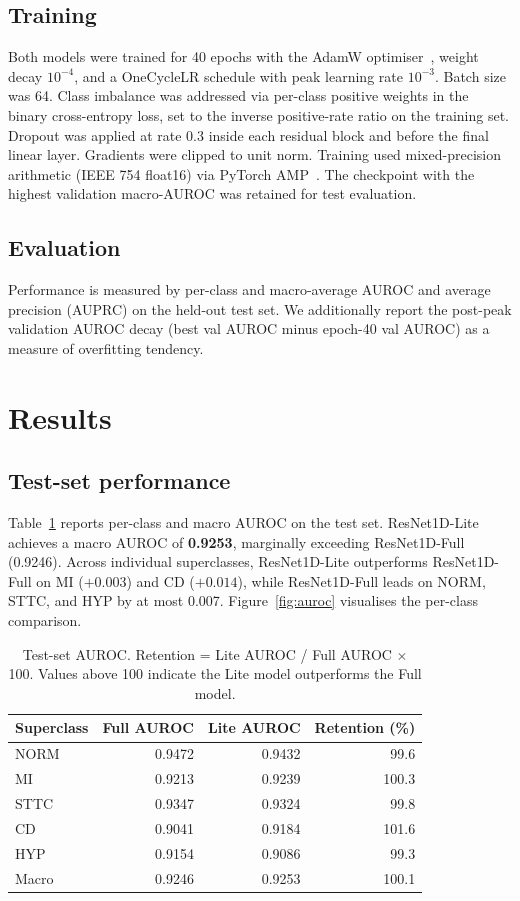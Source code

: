 \documentclass[11pt]{article}
\begin{document}
\subsection{Training}
Both models were trained for 40 epochs with the AdamW
optimiser~\cite{loshchilov2019}, weight decay $10^{-4}$, and a
OneCycleLR schedule with peak learning rate $10^{-3}$. Batch size was 64.
Class imbalance was addressed via per-class positive weights in the
binary cross-entropy loss, set to the inverse positive-rate ratio on the
training set. Dropout was applied at rate 0.3 inside each residual block
and before the final linear layer. Gradients were clipped to unit norm.
Training used mixed-precision arithmetic (IEEE 754 float16) via PyTorch
AMP~\cite{pytorch}. The checkpoint with the highest validation
macro-AUROC was retained for test evaluation.

\subsection{Evaluation}
Performance is measured by per-class and macro-average AUROC
and average precision (AUPRC) on the held-out test set.
We additionally report the post-peak validation AUROC decay
(best val AUROC minus epoch-40 val AUROC) as a measure of
overfitting tendency.

\section{Results}
\subsection{Test-set performance}
Table~\ref{tab:results} reports per-class and macro AUROC on the test
set. ResNet1D-Lite achieves a macro AUROC of \textbf{0.9253}, marginally
exceeding ResNet1D-Full (0.9246). Across individual superclasses,
ResNet1D-Lite outperforms ResNet1D-Full on MI ($+0.003$) and CD ($+0.014$),
while ResNet1D-Full leads on NORM, STTC, and HYP by at most 0.007.
Figure~\ref{fig:auroc} visualises the per-class comparison.

\begin{table}[h]
\centering
\caption{Test-set AUROC. Retention = Lite AUROC / Full AUROC $\times$ 100.
Values above 100 indicate the Lite model outperforms the Full model.}
\label{tab:results}
\begin{tabular}{lrrr}
\toprule
Superclass & Full AUROC & Lite AUROC & Retention (\%) \\
\midrule
NORM  & 0.9472 & 0.9432 & 99.6 \\
MI    & 0.9213 & 0.9239 & 100.3 \\
STTC  & 0.9347 & 0.9324 & 99.8 \\
CD    & 0.9041 & 0.9184 & 101.6 \\
HYP   & 0.9154 & 0.9086 & \phantom{1}99.3 \\
\midrule
Macro & 0.9246 & 0.9253 & 100.1 \\
\bottomrule
\end{tabular}
\end{table}
\end{document}
